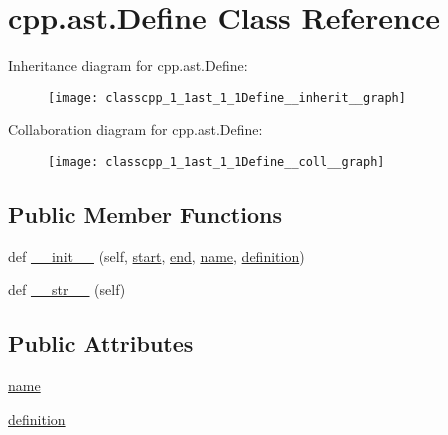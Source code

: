\hypertarget{classcpp_1_1ast_1_1Define}{}\section{cpp.\+ast.\+Define Class Reference}
\label{classcpp_1_1ast_1_1Define}


Inheritance diagram for cpp.\+ast.\+Define\+:\nopagebreak
\begin{figure}[H]
\begin{center}
\leavevmode
\texttt{[image: classcpp\_1\_1ast\_1\_1Define\_\_inherit\_\_graph]}
\end{center}
\end{figure}


Collaboration diagram for cpp.\+ast.\+Define\+:\nopagebreak
\begin{figure}[H]
\begin{center}
\leavevmode
\texttt{[image: classcpp\_1\_1ast\_1\_1Define\_\_coll\_\_graph]}
\end{center}
\end{figure}
\subsection*{Public Member Functions}
\begin{DoxyCompactItemize}
\item 
def \hyperlink{classcpp_1_1ast_1_1Define_ae9af61866e010a863ba9f8818ec8924c}{\+\_\+\+\_\+init\+\_\+\+\_\+} (self, \hyperlink{classcpp_1_1ast_1_1Node_a7b2aa97e6a049bb1a93aea48c48f1f44}{start}, \hyperlink{classcpp_1_1ast_1_1Node_a3c5e5246ccf619df28eca02e29d69647}{end}, \hyperlink{classcpp_1_1ast_1_1Define_a8879216f09e88f79d7baa49bcfa10ebd}{name}, \hyperlink{classcpp_1_1ast_1_1Define_a0c636652dfeb2f15e62793afea1153c9}{definition})
\item 
def \hyperlink{classcpp_1_1ast_1_1Define_aa89732914b19901c8d291e11f34bb627}{\+\_\+\+\_\+str\+\_\+\+\_\+} (self)
\end{DoxyCompactItemize}
\subsection*{Public Attributes}
\begin{DoxyCompactItemize}
\item 
\hyperlink{classcpp_1_1ast_1_1Define_a8879216f09e88f79d7baa49bcfa10ebd}{name}
\item 
\hyperlink{classcpp_1_1ast_1_1Define_a0c636652dfeb2f15e62793afea1153c9}{definition}
\end{DoxyCompactItemize}


